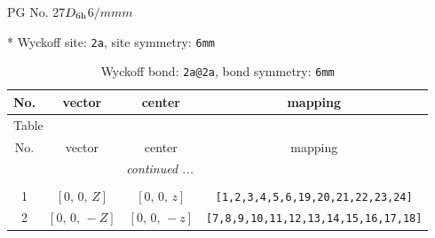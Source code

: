 \documentclass[fleqn,8pt]{jsarticle}
\begin{document}
\setcounter{MaxMatrixCols}{32}

\renewcommand{\tablename}{Table~}
\renewcommand{\figurename}{Figure~}
\begin{center}
\LARGE
PG No. 27\quad$D_{\rm 6h}$\quad$6/mmm$\quad[ hexagonal ]
\end{center}


* Wyckoff site: {\tt 2a}, site symmetry: {\tt 6mm}
\renewcommand{\arraystretch}{1.2}
\begin{longtable}{cccc}
\caption{Wyckoff bond: {\tt 2a@2a}, bond symmetry: {\tt 6mm}}
 \\
 \hline \hline
No. & vector & center & mapping \\ \hline \endfirsthead

\multicolumn{3}{l}{\tablename\ \thetable{}} \\
 \hline \hline
No. & vector & center & mapping \\ \hline \endhead

 \hline \hline
\multicolumn{3}{r}{\footnotesize\it continued ...} \\ \endfoot

 \hline \hline
\multicolumn{3}{r}{} \\ \endlastfoot

1 & $\left[ 0,\, 0,\, Z \right]$ & $\left[ 0,\, 0,\, z \right]$ & {\tt [1,2,3,4,5,6,19,20,21,22,23,24]} \\ \hline
2 & $\left[ 0,\, 0,\, - Z \right]$ & $\left[ 0,\, 0,\, - z \right]$ & {\tt [7,8,9,10,11,12,13,14,15,16,17,18]} \\
\end{longtable}
\renewcommand{\arraystretch}{1.2}
\end{document}
